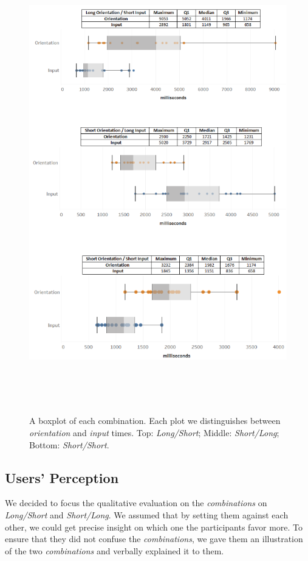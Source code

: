 \begin{figure}[t!]
\centering
\includegraphics[width=14cm, height=20cm]{Chapters/graphics/Times.png}
\caption{A boxplot of each combination. Each plot we distinguishes between \textit{orientation} and \textit{input} times. Top: \textit{Long/Short}; Middle: \textit{Short/Long}; Bottom: \textit{Short/Short}.}
\label{fig:times}
\end{figure}

\subsection{Users' Perception}

We decided to focus the qualitative evaluation on the \textit{combinations} on \textit{Long/Short} and \textit{Short/Long}. We assumed that by setting them against each other, we could get precise insight on which one the participants favor more. To ensure that they did not confuse the \textit{combinations}, we gave them an illustration of the two \textit{combinations} and verbally explained it to them.

